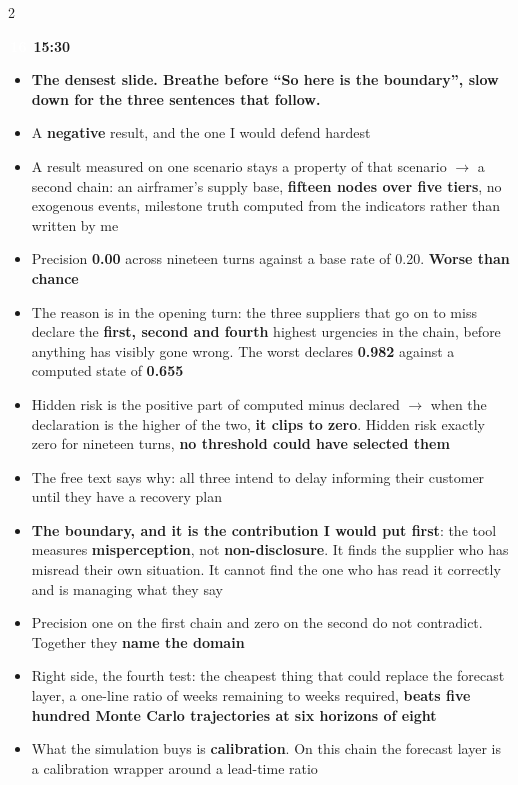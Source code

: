 \documentclass[a4paper,8pt]{extarticle}
\newcommand{\slidehead}[3]{%
  \par\vspace{2.8pt}\noindent
  \colorbox{altenNavy}{\textcolor{white}{\bfseries\,\footnotesize #1\,}}%
  \hspace{4pt}{\bfseries\color{altenNavy}#2}%
  \hfill{\bfseries\scriptsize\color{altenAzure}#3}\par\vspace{0.5pt}}
\newcommand{\scene}[1]{{\bfseries\color{altenAzureDark}#1}}
\newcommand{\num}[1]{\textbf{#1}}
\begin{document}
\begin{multicols}{2}
\slidehead{16}{Result three, the domain}{15:30}
\begin{itemize}
  \item \scene{The densest slide. Breathe before ``So here is the boundary'', slow down for the three sentences that follow.}
  \item A \textbf{negative} result, and the one I would defend hardest
  \item A result measured on one scenario stays a property of that scenario $\rightarrow$ a second chain: an airframer's supply base, \num{fifteen nodes over five tiers}, no exogenous events, milestone truth computed from the indicators rather than written by me
  \item Precision \num{0.00} across nineteen turns against a base rate of 0.20. \textbf{Worse than chance}
  \item The reason is in the opening turn: the three suppliers that go on to miss declare the \num{first, second and fourth} highest urgencies in the chain, before anything has visibly gone wrong. The worst declares \num{0.982} against a computed state of \num{0.655}
  \item Hidden risk is the positive part of computed minus declared $\rightarrow$ when the declaration is the higher of the two, \textbf{it clips to zero}. Hidden risk exactly zero for nineteen turns, \textbf{no threshold could have selected them}
  \item The free text says why: all three intend to delay informing their customer until they have a recovery plan
  \item \textbf{The boundary, and it is the contribution I would put first}: the tool measures \textbf{misperception}, not \textbf{non-disclosure}. It finds the supplier who has misread their own situation. It cannot find the one who has read it correctly and is managing what they say
  \item Precision one on the first chain and zero on the second do not contradict. Together they \textbf{name the domain}
  \item Right side, the fourth test: the cheapest thing that could replace the forecast layer, a one-line ratio of weeks remaining to weeks required, \textbf{beats five hundred Monte Carlo trajectories at six horizons of eight}
  \item What the simulation buys is \textbf{calibration}. On this chain the forecast layer is a calibration wrapper around a lead-time ratio
\end{itemize}


\end{multicols}
\end{document}
